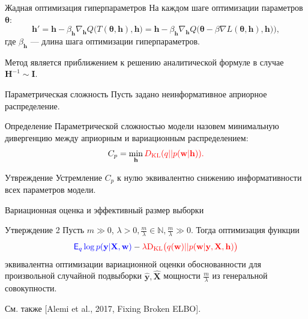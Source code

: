 \documentclass[usenames,dvipsnames,10pt,pdf,utf8,russian,aspectratio=43]{beamer}
\begin{document}
\begin{frame}{Жадная оптимизация гиперпараметров}
На каждом шаге оптимизации параметров $\boldsymbol{\theta}$:
\[
	\mathbf{h}' = \mathbf{h} - \beta_{\mathbf{h}} \nabla_{\mathbf{h}}  Q \bigl(T(\boldsymbol{\theta}, \mathbf{h}) , \mathbf{h}\bigr) = \mathbf{h} - \beta_{\mathbf{h}} \nabla_{\mathbf{h}}  Q\bigl(\boldsymbol{\theta} - \beta \nabla L(\boldsymbol{\theta}, \mathbf{h}), \mathbf{h})\bigr),
\]
где $\beta_{\mathbf{h}}$ --- длина шага оптимизации гиперпараметров.

Метод является приближением к решению аналитической формуле в случае $\mathbf{H}^{-1} \sim \mathbf{I}$.

\end{frame}


\begin{frame}{Параметрическая сложность}
Пусть задано неинформативное априорное распределение.
\begin{block}{Определение}
Параметрической сложностью модели назовем минимальную дивергенцию между априорным и вариационным распределением:
\vspace{-0.2cm}
\[
    C_p = \min_{\mathbf{h}} \textcolor{red}{D_\text{KL}(q||p(\mathbf{w}|\mathbf{h})).}
\]
\end{block}
\vspace{-0.2cm}

\begin{block}{Утвреждение}
Устремление $C_p$ к нулю эквивалентно снижению информативности всех параметров модели.
\end{block}
\end{frame}

\begin{frame}{Вариационная оценка и эффективный размер выборки}
\begin{block}{Утверждение 2}
Пусть $m \gg 0$, $\lambda > 0, \frac{m}{\lambda}   \in \mathbb{N}, \frac{m}{\lambda}  \gg 0.$ Тогда оптимизация функции
\[
\textcolor{blue}{\mathsf{E}_{q} \log p(\mathbf{y}|\mathbf{X}, \mathbf{w})} - \textcolor{red}{\lambda \textnormal{D}_\textnormal{KL}  \bigl(q(\mathbf{w})||p(\mathbf{w}|\mathbf{y}, \mathbf{X}, \mathbf{h})\bigr)}
\]
 эквивалентна оптимизации вариационной оценки обоснованности  
для произвольной случайной подвыборки $\hat{\mathbf{y}}, \hat{\mathbf{X}}$ мощности $\frac{m}{{\lambda}}$ из генеральной совокупности.
\end{block}

См. также [Alemi et al., 2017, Fixing Broken ELBO].
\end{frame}
\end{document}
